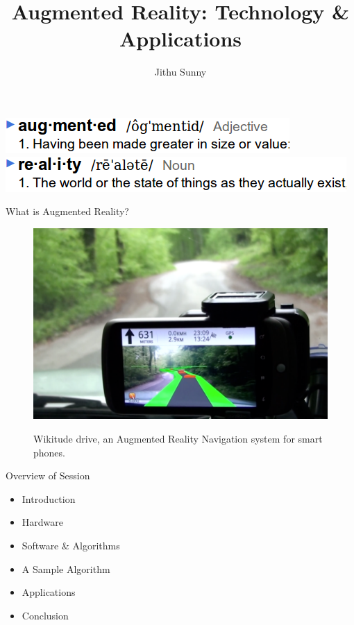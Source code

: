 \documentclass{beamer}
\title{Augmented Reality: Technology \& Applications}
\author{Jithu Sunny}
\begin{document}
\begin{frame}
	\maketitle
	\includegraphics[scale=.5]{augmented.png}\\
	\includegraphics[scale=.5]{reality.png}
\end{frame}


\begin{frame}{What is Augmented Reality?}
	\begin{figure}
		\pause \includegraphics[scale=.25]{wikitude.png}\\
		\caption{Wikitude drive, an Augmented Reality Navigation system for smart phones.}
	\end{figure}
\end{frame}


\begin{frame}{Overview of Session}
	\begin{itemize}
		\item Introduction
		\item Hardware
		\item Software \& Algorithms
		\item A Sample Algorithm
		\item Applications
		\item Conclusion
	\end{itemize}
\end{frame}
\end{document}
